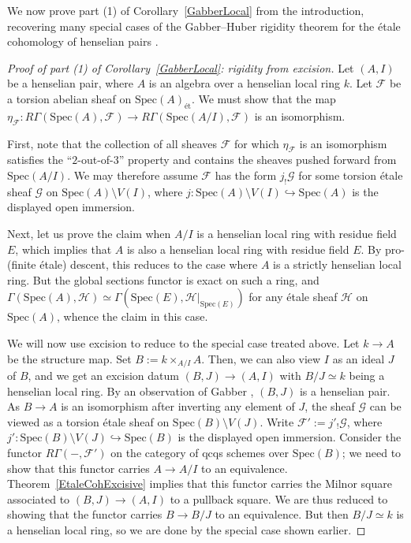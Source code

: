 \documentclass[reqno]{amsart}
\newcommand{\spec}{\mathrm{Spec}}
\theoremstyle{definition}
\begin{document}
We now prove part (1) of Corollary~\ref{GabberLocal} from the introduction,
recovering many special cases of the Gabber--Huber rigidity theorem for the \'etale cohomology of henselian pairs \cite{Gabber, Huber}.
\begin{proof}[Proof of part (1) of Corollary~\ref{GabberLocal}: rigidity from excision]
Let $(A,I)$ be a henselian pair, where $A$ is an algebra over a henselian local ring
$k$. Let $\mathcal{F}$ be a torsion abelian sheaf on $\spec(A)_{\text{\'et}}$. We must show that the map $\eta_{\mathcal{F}}\colon R\Gamma(\spec(A),\mathcal{F}) \to R\Gamma(\spec(A/I), \mathcal{F})$ is an isomorphism. 

First, note that the collection of all sheaves $\mathcal{F}$ for which
$\eta_{\mathcal{F}}$ is an isomorphism satisfies the ``$2$-out-of-$3$'' property
and contains the sheaves pushed forward from $\spec(A/I)$.  We may therefore assume $\mathcal{F}$ has the form $j_! \mathcal{G}$ for some torsion \'etale sheaf $\mathcal{G}$ on $\spec(A) \setminus V(I)$, where $j\colon \spec(A) \setminus V(I) \hookrightarrow \spec(A)$ is the displayed open immersion.

Next, let us prove the claim when $A/I$ is a henselian local ring with
residue field $E$, which implies that $A$ is also a henselian local ring with
residue field $E$. By pro-(finite \'etale) descent, this reduces to the case
where $A$ is a strictly henselian local ring. But the global sections functor is
exact on such a ring, and $\Gamma(\spec(A), \mathcal{H}) \simeq \Gamma(\spec(E),
\mathcal{H}|_{\spec(E)})$ for any \'etale sheaf $\mathcal{H}$ on $\spec(A)$,
whence the claim in this case.

We will now use excision to reduce to the special case treated above. Let $k \to
A$ be the structure map. Set $B := k \times_{A/I} A$. Then, we can also view $I$
as an ideal $J$ of $B$, and we get an excision datum $(B,J) \to (A,I)$ with $B/J
\simeq k$ being a henselian local ring. 
By an observation of Gabber 
\cite{Gabberpair}, $(B, J)$ is a henselian pair. 
As $B \to A$ is an isomorphism after
inverting any element of $J$, the sheaf $\mathcal{G}$ can be viewed as a torsion
\'etale sheaf on $\spec(B) \setminus V(J)$. Write $\mathcal{F}' := j'_!
\mathcal{G}$, where $j'\colon \spec(B) \setminus V(J) \hookrightarrow \spec(B)$
is the displayed open immersion. Consider the functor $R\Gamma(-, \mathcal{F}')$
on the category of qcqs schemes over $\spec(B)$; we need to show that this functor
carries $A \to A/I$ to an equivalence. Theorem~\ref{EtaleCohExcisive} implies that this functor carries the Milnor square associated to $(B,J) \to (A,I)$ to a  pullback square.
We are thus reduced to showing that the functor carries $B \to B/J$ to an
equivalence. But then $B/J \simeq k$ is a henselian local ring, so we are done by the special case shown earlier.
\end{proof}
\end{document}
